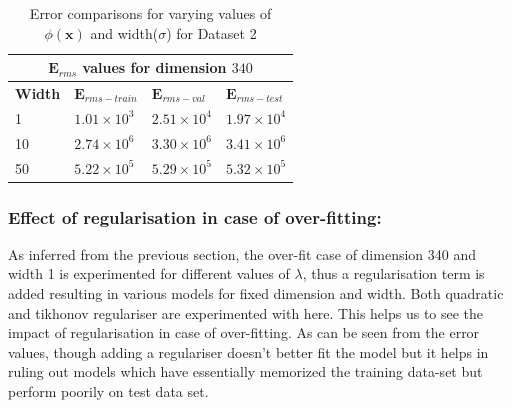 {
\begin{table}[hptb]
\begin{tabular}{ |p{1.5cm}|p{3cm}|p{3cm}| p{3cm}|  }
\hline
\multicolumn{4}{|c|}{$\mathbf{E}_{rms}$ values for dimension $340$ } \\
\hline
\rowcolor{lightgray} \textbf{Width} & $\mathbf{E}_{rms-train}$ & $\mathbf{E}_{rms-val}$ & $\mathbf{E}_{rms-test}$ \\
\hline
  1   &   $1.01 \times 10^3$   &  $2.51 \times 10^4 $        &     $1.97 \times 10^4 $   \\
 \hline
 10   &   $2.74 \times 10^6$  &  $3.30 \times 10^6 $          &     $3.41 \times 10^6 $   \\
 \hline
 50   &   $5.22 \times 10^5$  & $5.29 \times 10^5$          &         $5.32 \times 10^5$   \\
\hline
\end{tabular}
\caption{Error comparisons for varying values of $\phi(\mathbf{x}) $  and width($\sigma$) for Dataset 2}
\label{table:8}
\end{table}
}

\newpage
\subsubsection{Effect of regularisation in case of over-fitting:}

As inferred from the previous section, the over-fit case of dimension 340 and width 1 is experimented for different values of $\lambda$, thus a regularisation term is added resulting in various models for fixed dimension and width. Both quadratic and tikhonov regulariser are experimented with here. This helps us to see the impact of regularisation in case of over-fitting. As can be seen from the error values, though adding a regulariser doesn't better fit the model but it helps in ruling out models which have essentially memorized the training data-set but perform poorily on test data set.

